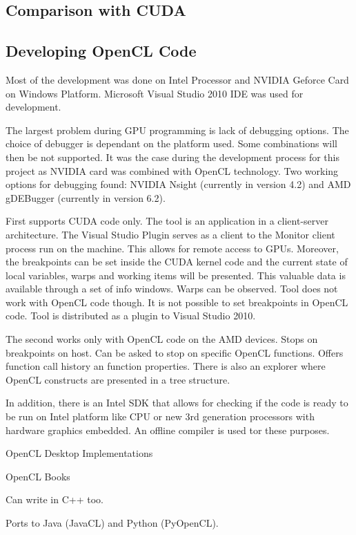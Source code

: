 \subsection{Comparison with CUDA}

\subsection{Developing OpenCL Code}
Most of the development was done on Intel Processor and NVIDIA Geforce Card on Windows Platform. Microsoft Visual Studio 2010 IDE was used for development.

The largest problem during GPU programming is lack of debugging options. The choice of debugger is dependant on the platform used. Some combinations will then be not supported. It was the case during the development process for this project as NVIDIA card was combined with OpenCL technology.  Two working options for debugging found: NVIDIA Nsight (currently in version 4.2) and AMD gDEBugger (currently in version 6.2).

First supports CUDA code only. The tool is an application in a client-server architecture.  The Visual Studio Plugin serves as a client to the Monitor client process run on the machine. This allows for remote access to GPUs. Moreover, the breakpoints can be set inside the CUDA kernel code and the current state of local variables, warps and working items will be presented. This valuable data is available through a set of info windows. Warps can be observed. Tool does not work with OpenCL code though. It is not possible to set breakpoints in OpenCL code. Tool is distributed as a plugin to Visual Studio 2010.

The second works only with OpenCL code on the AMD devices. Stops on breakpoints on host. Can be asked to stop on specific OpenCL functions. Offers function call history an function properties. There is also an explorer where OpenCL constructs are presented in a tree structure.

In addition, there is an Intel SDK that allows for checking if the code is ready to be run on Intel platform like CPU or new 3rd generation processors with hardware graphics embedded. An offline compiler is used tor these purposes. 

OpenCL Desktop Implementations


OpenCL Books


Can write in C++ too.

Ports to Java (JavaCL) and Python (PyOpenCL).

